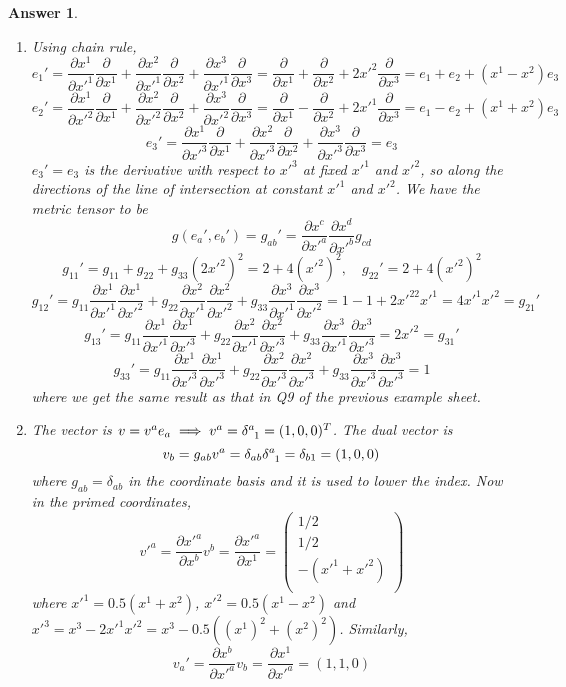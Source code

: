 \documentclass[a4paper]{article}
\newtheorem{ans}{Answer}[subsection]
\theoremstyle{new}
\begin{document}
\begin{ans}\leavevmode
\begin{enumerate}[label=(\alph*)]
\item Using chain rule,
$$e_1'=\frac{\partial x^1}{\partial x'^1}\frac{\partial}{\partial x^1}+\frac{\partial x^2}{\partial x'^1}\frac{\partial}{\partial x^2}+\frac{\partial x^3}{\partial x'^1}\frac{\partial}{\partial x^3}=\frac{\partial}{\partial x^1}+\frac{\partial}{\partial x^2}+2x'^2\frac{\partial}{\partial x^3}=e_1+e_2+(x^1-x^2)e_3$$
$$e_2'=\frac{\partial x^1}{\partial x'^2}\frac{\partial}{\partial x^1}+\frac{\partial x^2}{\partial x'^2}\frac{\partial}{\partial x^2}+\frac{\partial x^3}{\partial x'^2}\frac{\partial}{\partial x^3}=\frac{\partial}{\partial x^1}-\frac{\partial}{\partial x^2}+2x'^1\frac{\partial}{\partial x^3}=e_1-e_2+(x^1+x^2)e_3$$
$$e_3'=\frac{\partial x^1}{\partial x'^3}\frac{\partial}{\partial x^1}+\frac{\partial x^2}{\partial x'^3}\frac{\partial}{\partial x^2}+\frac{\partial x^3}{\partial x'^3}\frac{\partial}{\partial x^3}=e_3$$
$e_3'=e_3$ is the derivative with respect to $x'^3$ at fixed $x'^1$ and $x'^2$, so along the directions of the line of intersection at constant $x'^1$ and $x'^2$. We have the metric tensor to be 
$$g(e_a',e_b')=g_{ab}'=\frac{\partial x^c}{\partial x'^a}\frac{\partial x^d}{\partial x'^b}g_{cd}$$
$$g_{11}'=g_{11}+g_{22}+g_{33}(2x'^2)^2=2+4(x'^2)^2,\quad g_{22}'=2+4(x'^2)^2$$
$$g_{12}'=g_{11}\frac{\partial x^1}{\partial x'^1}\frac{\partial x^1}{\partial x'^2}+g_{22}\frac{\partial x^2}{\partial x'^1}\frac{\partial x^2}{\partial x'^2}+g_{33}\frac{\partial x^3}{\partial x'^1}\frac{\partial x^3}{\partial x'^2}=1-1+2x'^22x'^1=4x'^1x'^2=g_{21}'$$
$$g_{13}'=g_{11}\frac{\partial x^1}{\partial x'^1}\frac{\partial x^1}{\partial x'^3}+g_{22}\frac{\partial x^2}{\partial x'^1}\frac{\partial x^2}{\partial x'^3}+g_{33}\frac{\partial x^3}{\partial x'^1}\frac{\partial x^3}{\partial x'^3}=2x'^2=g_{31}'$$
$$g_{33}'=g_{11}\frac{\partial x^1}{\partial x'^3}\frac{\partial x^1}{\partial x'^3}+g_{22}\frac{\partial x^2}{\partial x'^3}\frac{\partial x^2}{\partial x'^3}+g_{33}\frac{\partial x^3}{\partial x'^3}\frac{\partial x^3}{\partial x'^3}=1$$
where we get the same result as that in Q9 of the previous example sheet.
\item The vector is $v=v^ae_a\implies v^a=\tensor*{\delta}{*_{}^{a}_{1}}=(1,0,0)^T$. The dual vector is
$$v_b=g_{ab}v^a=\delta_{ab}\tensor*{\delta}{*_{}^{a}_{1}}=\delta_{b1}=(1,0,0)$$
where $g_{ab}=\delta_{ab}$ in the coordinate basis and it is used to lower the index. Now in the primed coordinates,
$$v'^a=\frac{\partial x'^a}{\partial x^b}v^b=\frac{\partial x'^a}{\partial x^1}=\begin{pmatrix}1/2\\1/2\\-(x'^1+x'^2)\\\end{pmatrix}$$
where $x'^1=0.5(x^1+x^2)$, $x'^2=0.5(x^1-x^2)$ and $x'^3=x^3-2x'^1x'^2=x^3-0.5((x^1)^2+(x^2)^2)$. Similarly,
$$v_a'=\frac{\partial x^b}{\partial x'^a}v_b=\frac{\partial x^1}{\partial x'^a}=(1,1,0)$$
\end{enumerate}
\end{ans}
\end{document}
